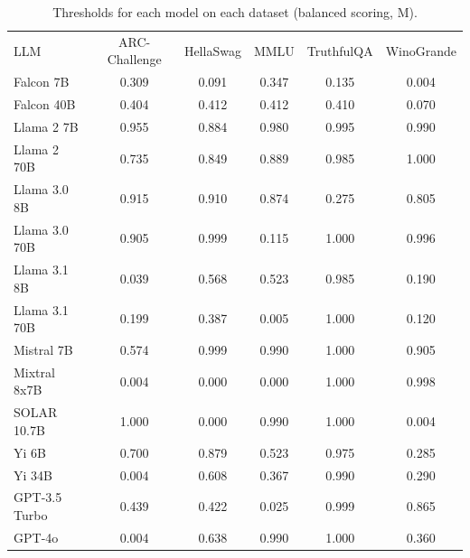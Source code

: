 \begin{table}[h]
\caption{Thresholds for each model on each dataset (balanced scoring, M). }
\label{tab:thresholds_prob_margin_k20_w1}
\centering
\begin{tabular}{l S[table-format=3.1] S[table-format=3.1] S[table-format=3.1] S[table-format=3.1] S[table-format=3.1]}
\toprule
LLM & ARC-Challenge & HellaSwag & MMLU & TruthfulQA & WinoGrande \\ 
\cmidrule(lr){1-1} \cmidrule(lr){2-2} \cmidrule(lr){3-3} \cmidrule(lr){4-4} \cmidrule(lr){5-5} \cmidrule(lr){6-6}
Falcon 7B & 0.309 & 0.091 & 0.347 & 0.135 & 0.004\\
Falcon 40B & 0.404 & 0.412 & 0.412 & 0.410 & 0.070\\
Llama 2 7B & 0.955 & 0.884 & 0.980 & 0.995 & 0.990\\
Llama 2 70B & 0.735 & 0.849 & 0.889 & 0.985 & 1.000\\
Llama 3.0 8B & 0.915 & 0.910 & 0.874 & 0.275 & 0.805\\
Llama 3.0 70B & 0.905 & 0.999 & 0.115 & 1.000 & 0.996\\
Llama 3.1 8B & 0.039 & 0.568 & 0.523 & 0.985 & 0.190\\
Llama 3.1 70B & 0.199 & 0.387 & 0.005 & 1.000 & 0.120\\
Mistral 7B & 0.574 & 0.999 & 0.990 & 1.000 & 0.905\\
Mixtral 8x7B & 0.004 & 0.000 & 0.000 & 1.000 & 0.998\\
SOLAR 10.7B & 1.000 & 0.000 & 0.990 & 1.000 & 0.004\\
Yi 6B & 0.700 & 0.879 & 0.523 & 0.975 & 0.285\\
Yi 34B & 0.004 & 0.608 & 0.367 & 0.990 & 0.290\\
GPT-3.5 Turbo & 0.439 & 0.422 & 0.025 & 0.999 & 0.865\\
GPT-4o & 0.004 & 0.638 & 0.990 & 1.000 & 0.360\\
\bottomrule
\end{tabular}
\end{table}
